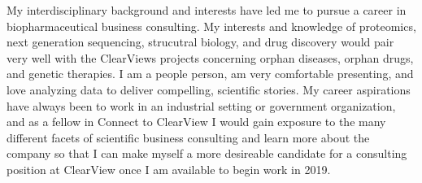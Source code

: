 \documentclass[11pt, letterpaper]{CV_latex_class}
\begin{document}
\begin{cvletter}
My interdisciplinary background and interests have led me to pursue a career in biopharmaceutical business consulting. My interests and knowledge of proteomics, next generation sequencing, strucutral biology, and drug discovery would pair very well with the ClearViews projects concerning orphan diseases, orphan drugs, and genetic therapies. I am a people person, am very comfortable presenting, and love analyzing data to deliver compelling, scientific stories. My career aspirations have always been to work in an industrial setting or government organization, and as a fellow in Connect to ClearView I would gain exposure to the many different facets of scientific business consulting and learn more about the company so that I can make myself a more desireable candidate for a consulting position at ClearView once I am available to begin work in 2019.

\end{cvletter}


\makeletterclosing

\end{document}
